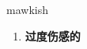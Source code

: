 
\begin{frame}
{\huge mawkish}
\begin{center}
\begin{enumerate}\Large
  \item \textbf{过度伤感的}
\end{enumerate}
\end{center}
\end{frame}
